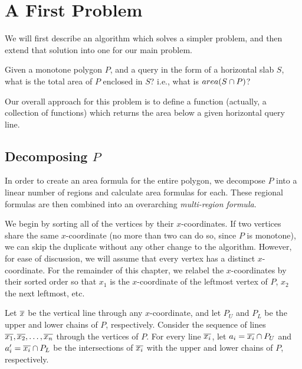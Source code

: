 \section{A First Problem}
\label{:monotonep:approach}

We will first describe an algorithm which solves a simpler problem, and then extend that solution into one for our main problem.

\begin{problem}
Given a monotone polygon $P$, and a query in the form of a horizontal slab $S$, what is the total area of $P$ enclosed in $S$?  i.e., what is $area(S \cap P)$?
\end{problem}

Our overall approach for this problem is to define a function (actually, a collection of functions) which returns the area below a given horizontal query line. 

\subsection{Decomposing $P$}
\label{sec:decompose}

In order to create an area formula for the entire polygon, we decompose $P$ into a linear number of regions and calculate area formulas for each. These regional formulas are then combined into an overarching \emph{multi-region formula}.

We begin by sorting all of the vertices by their $x$-coordinates. 
If two vertices share the same $x$-coordinate (no more than two can do so, since $P$ is monotone), we can skip the duplicate without any other change to the algorithm. 
However, for ease of discussion, we will assume that every vertex has a distinct $x$-coordinate.
For the remainder of this chapter, we relabel the $x$-coordinates by their sorted order so that $x_1$ is the $x$-coordinate of the leftmost vertex of $P$, $x_2$ the next leftmost, etc.

Let $\overline{x}$ be the vertical line through any $x$-coordinate, and let $P_U$ and $P_L$ be the upper and lower chains of $P$, respectively. Consider the sequence of lines $\overline{x_1}, \overline{x_2}, \ldots, \overline{x_n}$ through the vertices of $P$.
For every line $\overline{x_i}$, let $a_i = \overline{x_i} \cap P_U$ and $a_i' = \overline{x_i} \cap P_L$ be the intersections of $\overline{x_i}$ with the upper and lower chains of $P$, respectively.

